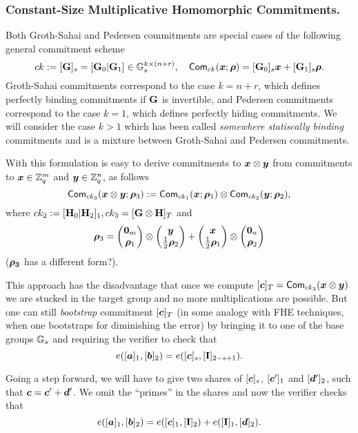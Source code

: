 \subsubsection{Constant-Size  Multiplicative Homomorphic Commitments.}
Both Groth-Sahai and Pedersen commitments are special cases of the following general commitment scheme
$$
ck:=[\mathbf{{G}}]_s=[\mathbf{{G}}_0|\mathbf{{G}}_1]\in\mathbb{G}_s^{k\times (n+r)}, \quad \mathsf{Com}_{ck}({\boldsymbol{x}};{\boldsymbol{\rho}})=[\mathbf{{G}}_0]_s{\boldsymbol{x}}+[\mathbf{{G}}_1]_s{\boldsymbol{\rho}}.
$$
Groth-Sahai commitments correspond to the case $k=n+r$, which defines perfectly binding commitments if $\mathbf{{G}}$ is invertible, and Pedersen commitments correspond to the case $k=1$, which defines perfectly hiding commitments. We will consider the case $k>1$ which has been called \emph{somewhere statiscally binding} commitments and is a mixture between Groth-Sahai and Pedersen commitments.

With this formulation is easy to derive commitments to ${\boldsymbol{x}}\otimes{\boldsymbol{y}}$ from commitments to ${\boldsymbol{x}}\in\mathbb{Z}_q^m$ and ${\boldsymbol{y}}\in\mathbb{Z}_q^n$, as follows
$$
\mathsf{Com}_{ck_3}({\boldsymbol{{\boldsymbol{x}}}}\otimes{\boldsymbol{y}};{\boldsymbol{\rho}}_3):=\mathsf{Com}_{ck_1}({\boldsymbol{x}};{\boldsymbol{\rho}}_1)\otimes\mathsf{Com}_{ck_2}({\boldsymbol{y}};{\boldsymbol{\rho}}_2),
$$
where $ck_2:=[\mathbf{{H}}_0|\mathbf{{H}}_2]_1,ck_3=[\mathbf{{G}}\otimes\mathbf{{H}}]_T$ and
$${\boldsymbol{\rho}}_3=\left(\begin{matrix}{\boldsymbol{0}}_m\\{\boldsymbol{\rho}}_1\end{matrix}\right)\otimes\left(\begin{matrix}{\boldsymbol{y}}\\\frac{1}{2}{\boldsymbol{\rho}}_2\end{matrix}\right)+\left(\begin{matrix}{\boldsymbol{x}}\\\frac{1}{2}{\boldsymbol{\rho}}_1\end{matrix}\right)\otimes\left(\begin{matrix}{\boldsymbol{0}}_n\\{\boldsymbol{\rho}}_2\end{matrix}\right)$$ (${\boldsymbol{\rho_3}}$ has a different form?).

This approach has the disadvantage that once we compute $[{\boldsymbol{c}}]_T=\mathsf{Com}_{ck_3}({\boldsymbol{x}}\otimes{\boldsymbol{y}})$ we are stucked in the target group and no more multiplications are possible. But one can still \emph{bootstrap} commitment $[{\boldsymbol{c}}]_T$ (in some analogy with FHE techniques, when one bootstraps for diminishing the error)  by bringing it to one of the base groups $\mathbb{G}_s$ and requiring the verifier to check that
$$
e([{\boldsymbol{a}}]_1,[{\boldsymbol{b}}]_2)=e([{\boldsymbol{c}}]_s,[\mathbf{{I}}]_{2-s+1}).
$$

Going a step forward, we will have to give two shares of $[{\boldsymbol{c}}]_s$,  $[{\boldsymbol{c}}']_1$ and $[{\boldsymbol{d}}']_2$, such that ${\boldsymbol{c}}={\boldsymbol{c}}'+{\boldsymbol{d}}'$. We omit the ``primes'' in the shares and now the verifier checks that
$$
e([{\boldsymbol{a}}]_1,[{\boldsymbol{b}}]_2)=e([{\boldsymbol{c}}]_1,[\mathbf{{I}}]_{2}) + e([\mathbf{{I}}]_{1},[{\boldsymbol{d}}]_2).
$$

